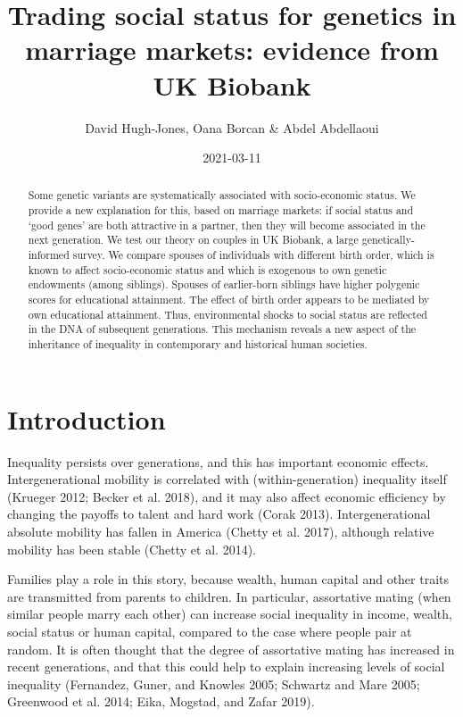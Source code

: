 \documentclass[
]{article}
\title{Trading social status for genetics in marriage markets: evidence from UK Biobank}
\author{David Hugh-Jones, Oana Borcan \& Abdel Abdellaoui}
\date{2021-03-11}
\begin{document}
\maketitle
\begin{abstract}
Some genetic variants are systematically associated with
socio-economic status. We provide a new explanation for this, based on
marriage markets: if social status and `good genes' are both attractive in
a partner, then they will become associated in the next generation. We test
our theory on couples in UK Biobank, a large genetically-informed survey.
We compare spouses of individuals with different birth order, which is
known to affect socio-economic status and which is
exogenous to own genetic endowments (among siblings). Spouses of
earlier-born siblings have higher polygenic scores for educational
attainment. The effect of birth order appears to be mediated by own
educational attainment. Thus, environmental shocks to social status are
reflected in the DNA of subsequent generations. This mechanism reveals a
new aspect of the inheritance of inequality in contemporary and
historical human societies.
\end{abstract}

\normalem

\hypertarget{introduction}{%
\section{Introduction}\label{introduction}}

Inequality persists over generations, and this has important economic
effects. Intergenerational mobility is correlated with
(within-generation) inequality itself (Krueger 2012; Becker et al. 2018), and it may also affect economic efficiency by
changing the payoffs to talent and hard work (Corak 2013).
Intergenerational absolute mobility has fallen in America
(Chetty et al. 2017), although relative mobility has been stable
(Chetty et al. 2014).

Families play a role in this story, because wealth, human capital and
other traits are transmitted from parents to children. In particular,
assortative mating (when similar people marry each other) can increase
social inequality in income, wealth, social status or human capital,
compared to the case where people pair at random. It is often thought
that the degree of assortative mating has increased in recent
generations, and that this could help to explain increasing levels of
social inequality (Fernandez, Guner, and Knowles 2005; Schwartz and Mare 2005; Greenwood et al. 2014; Eika, Mogstad, and Zafar 2019).
\end{document}
